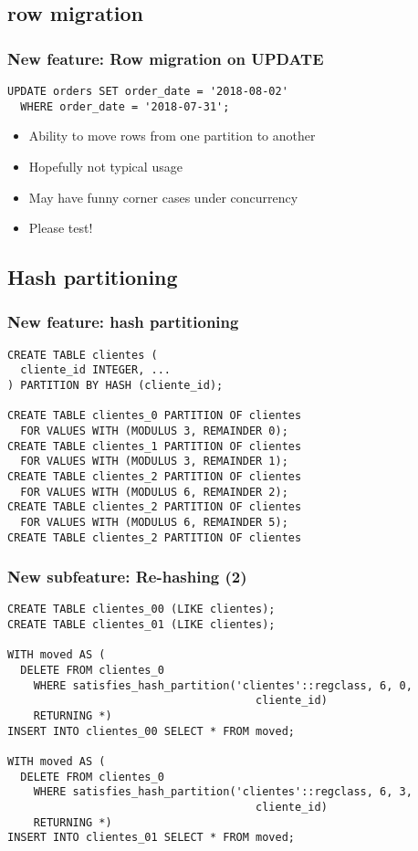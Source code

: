   \subsection{row migration}
\begin{frame}[fragile]
  \frametitle{New feature: Row migration on UPDATE}

  \begin{lstlisting}
UPDATE orders SET order_date = '2018-08-02'
  WHERE order_date = '2018-07-31';
  \end{lstlisting}

  \begin{itemize}
    \item Ability to move rows from one partition to another
    \item Hopefully not typical usage
    \item May have funny corner cases under concurrency
    \item<2-> Please test!
  \end{itemize}
\end{frame}

\subsection{Hash partitioning}
\begin{frame}[fragile]
  \frametitle{New feature: hash partitioning}


  \begin{lstlisting}
CREATE TABLE clientes (
  cliente_id INTEGER, ...
) PARTITION BY HASH (cliente_id);

CREATE TABLE clientes_0 PARTITION OF clientes
  FOR VALUES WITH (MODULUS 3, REMAINDER 0);
CREATE TABLE clientes_1 PARTITION OF clientes
  FOR VALUES WITH (MODULUS 3, REMAINDER 1);
CREATE TABLE clientes_2 PARTITION OF clientes
  FOR VALUES WITH (MODULUS 6, REMAINDER 2);
CREATE TABLE clientes_2 PARTITION OF clientes
  FOR VALUES WITH (MODULUS 6, REMAINDER 5);
CREATE TABLE clientes_2 PARTITION OF clientes

  \end{lstlisting}
\end{frame}

\begin{frame}[fragile]
  \frametitle{New subfeature: Re-hashing (2)}

\footnotesize
  \begin{lstlisting}
CREATE TABLE clientes_00 (LIKE clientes);
CREATE TABLE clientes_01 (LIKE clientes);

WITH moved AS (
  DELETE FROM clientes_0
    WHERE satisfies_hash_partition('clientes'::regclass, 6, 0,
                                      cliente_id)
    RETURNING *)
INSERT INTO clientes_00 SELECT * FROM moved;

WITH moved AS (
  DELETE FROM clientes_0
    WHERE satisfies_hash_partition('clientes'::regclass, 6, 3,
                                      cliente_id)
    RETURNING *)
INSERT INTO clientes_01 SELECT * FROM moved;
  \end{lstlisting}

\end{frame}

